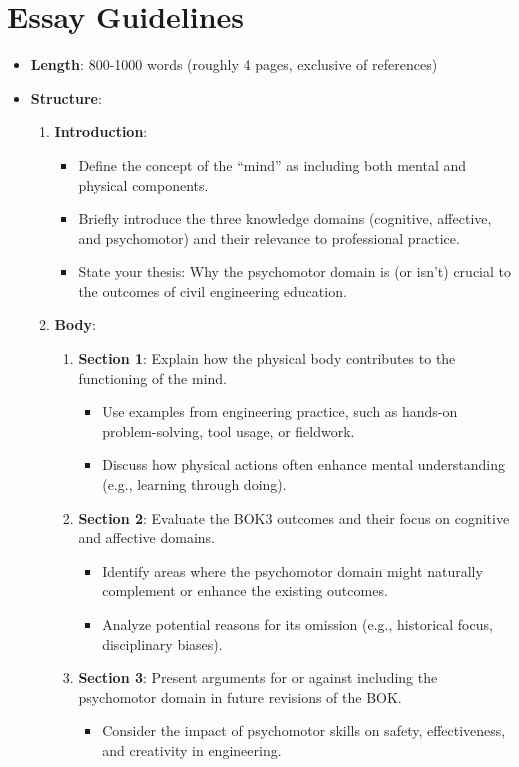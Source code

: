 \documentclass[12pt]{article}
\begin{document}
\section*{\small{Essay Guidelines}}
\begin{itemize}
    \item \textbf{Length}: 800-1000 words (roughly 4 pages, exclusive of references)
    \item \textbf{Structure}:
    \begin{enumerate}
        \item \textbf{Introduction}:
        \begin{itemize}
            \item Define the concept of the ``mind'' as including both mental and physical components.
            \item Briefly introduce the three knowledge domains (cognitive, affective, and psychomotor) and their relevance to professional practice.
            \item State your thesis: Why the psychomotor domain is (or isn’t) crucial to the outcomes of civil engineering education.
        \end{itemize}
        
        \item \textbf{Body}:
        \begin{enumerate}
            \item \textbf{Section 1}: Explain how the physical body contributes to the functioning of the mind.
            \begin{itemize}
                \item Use examples from engineering practice, such as hands-on problem-solving, tool usage, or fieldwork.
                \item Discuss how physical actions often enhance mental understanding (e.g., learning through doing).
            \end{itemize}
            \item \textbf{Section 2}: Evaluate the BOK3 outcomes and their focus on cognitive and affective domains.
            \begin{itemize}
                \item Identify areas where the psychomotor domain might naturally complement or enhance the existing outcomes.
                \item Analyze potential reasons for its omission (e.g., historical focus, disciplinary biases).
            \end{itemize}
            \item \textbf{Section 3}: Present arguments for or against including the psychomotor domain in future revisions of the BOK.
            \begin{itemize}
                \item Consider the impact of psychomotor skills on safety, effectiveness, and creativity in engineering.
            \end{itemize}
        \end{enumerate}
        

\end{enumerate}
\end{itemize}
\end{document}
